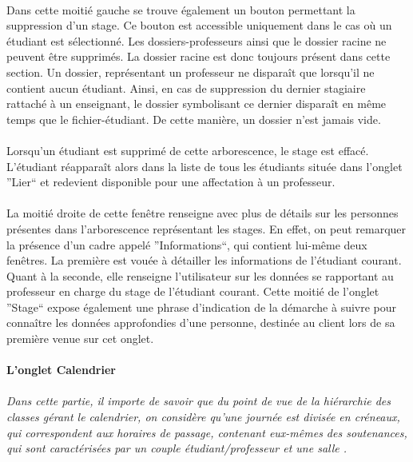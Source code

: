 \documentclass[a4paper,10pt]{report}
\begin{document}
	      \paragraph{}
		Dans cette moitié gauche se trouve également un bouton permettant la suppression d'un stage.
		Ce bouton est accessible uniquement dans le cas où un étudiant est sélectionné.
		Les dossiers-professeurs ainsi que le dossier racine ne peuvent être supprimés.
		La dossier racine est donc toujours présent dans cette section.
		Un dossier, représentant un professeur ne disparaît que lorsqu'il ne contient aucun étudiant.
		Ainsi, en cas de suppression du dernier stagiaire rattaché à un enseignant, le dossier symbolisant ce dernier disparaît en même temps que le fichier-étudiant.
		De cette manière, un dossier n'est jamais vide.
		
	      \paragraph{}
		Lorsqu'un étudiant est supprimé de cette arborescence, le stage est effacé.
		L'étudiant réapparaît alors dans la liste de tous les étudiants située dans l'onglet ''Lier`` et redevient disponible pour une affectation à un professeur.
		
	      \paragraph{}
		La moitié droite de cette fenêtre renseigne avec plus de détails sur les personnes présentes dans l'arborescence représentant les stages.
		En effet, on peut remarquer la présence d'un cadre appelé ''Informations``, qui contient lui-même deux fenêtres.
		La première est vouée à détailler les informations de l'étudiant courant. 
		Quant à la seconde, elle renseigne l'utilisateur sur les données se rapportant au professeur en charge du stage de l'étudiant courant. 
		Cette moitié de l'onglet ''Stage`` expose également une phrase d'indication de la démarche à suivre pour connaître les données approfondies d'une personne, destinée au client lors de sa première venue sur cet onglet.
		
		\newpage
	    \paragraph{L'onglet Calendrier}
	      \paragraph{}
		\textit{Dans cette partie, il importe de savoir que du point de vue de la hiérarchie des classes gérant le calendrier, on considère qu'une journée est divisée en créneaux, qui correspondent aux horaires de passage, contenant eux-mêmes des soutenances, qui sont caractérisées par un couple étudiant/professeur et une salle	.} 
		
\end{document}
